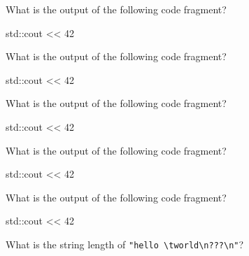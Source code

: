 \nextq
What is the output of the following code fragment?
\begin{console}[fontsize=\footnotesize]
std::cout << 42 %
\end{console}
\ANSWER
\begin{answercode}

\end{answercode}

\nextq
What is the output of the following code fragment?
\begin{console}[fontsize=\footnotesize]
std::cout << 42 %
\end{console}
\ANSWER
\begin{answercode}

\end{answercode}

\nextq
What is the output of the following code fragment?
\begin{console}[fontsize=\footnotesize]
std::cout << 42 %
\end{console}
\ANSWER
\begin{answercode}

\end{answercode}

\nextq
What is the output of the following code fragment?
\begin{console}[fontsize=\footnotesize]
std::cout << 42 %
\end{console}
\ANSWER
\begin{answercode}

\end{answercode}

\nextq
What is the output of the following code fragment?
\begin{console}[fontsize=\footnotesize]
std::cout << 42 %
\end{console}
\ANSWER
\begin{answercode}

\end{answercode}

\nextq
What is the string length of \verb!"hello \tworld\n???\n"!?
\\
\ANSWER
\begin{answercode}

\end{answercode}


